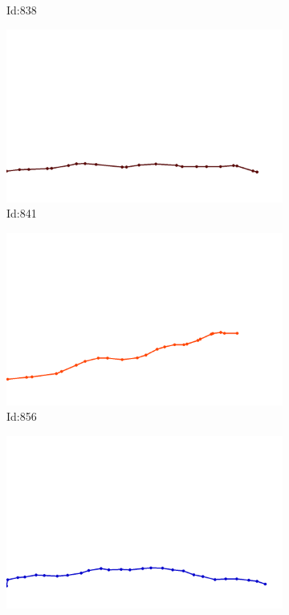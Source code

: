 \documentclass[12pt,twoside]{report}
\begin{document}
\begin{figure}
\begin{subfigure}[b]{0.20\textwidth}
\caption{Id:838}
\end{subfigure}
\begin{subfigure}[b]{0.20\textwidth}
\centering
\includegraphics[width=\textwidth]{../trajectories/841.png}
\caption{Id:841}
\end{subfigure}
\begin{subfigure}[b]{0.20\textwidth}
\centering
\includegraphics[width=\textwidth]{../trajectories/856.png}
\caption{Id:856}
\end{subfigure}
\begin{subfigure}[b]{0.20\textwidth}
\centering
\includegraphics[width=\textwidth]{../trajectories/882.png}

\end{subfigure}
\end{figure}
\end{document}
